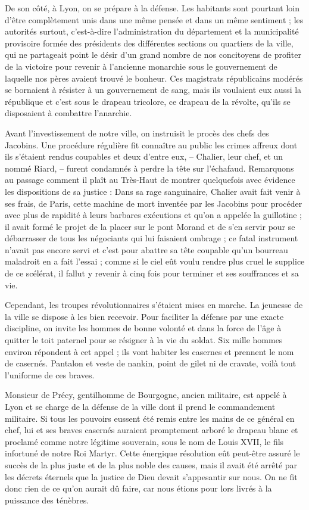 \documentclass[11pt,a4paper]{report}
\begin{document}
De son côté, à Lyon, on se prépare à la défense. Les habitants sont pourtant loin d'être complètement unis dans une même pensée et dans un même sentiment ; les autorités surtout, c'est-à-dire l'administration du département et la municipalité provisoire formée des présidents des différentes sections ou quartiers de la ville, qui ne partageait point le désir d'un grand nombre de nos concitoyens de profiter de la victoire pour revenir à l'ancienne monarchie sous le gouvernement de laquelle nos pères avaient trouvé le bonheur. Ces magistrats républicains modérés se bornaient à résister à un gouvernement de sang, mais ils voulaient eux aussi la république et c'est sous le drapeau tricolore, ce drapeau de la révolte, qu'ils se disposaient à combattre l'anarchie.

Avant l'investissement de notre ville, on instruisit le procès des chefs des Jacobins. Une procédure régulière fit connaître au public les crimes affreux dont ils s'étaient rendus coupables et deux d'entre eux, -- Chalier, leur chef, et un nommé Riard, -- furent condamnés à perdre la tête sur l'échafaud. Remarquons au passage comment il plaît au Très-Haut de montrer quelquefois avec évidence les dispositions de sa justice : Dans sa rage sanguinaire, Chalier avait fait venir à ses frais, de Paris, cette machine de mort inventée par les Jacobins pour procéder avec plus de rapidité à leurs barbares exécutions et qu'on a appelée la guillotine ; il avait formé le projet de la placer sur le pont Morand et de s'en servir pour se débarrasser de tous les négociants qui lui faisaient ombrage ; ce fatal instrument n'avait pas encore servi et c'est pour abattre sa tête coupable qu'un bourreau maladroit en a fait l'essai ; comme si le ciel eût voulu rendre plus cruel le supplice de ce scélérat, il fallut y revenir à cinq fois pour terminer et ses souffrances et sa vie.

Cependant, les troupes révolutionnaires s'étaient mises en marche. La jeunesse de la ville se dispose à les bien recevoir. Pour faciliter la défense par une exacte discipline, on invite les hommes de bonne volonté et dans la force de l'âge à quitter le toit paternel pour se résigner à la vie du soldat. Six mille hommes environ répondent à cet appel ; ils vont habiter les casernes et prennent le nom de casernés. Pantalon et veste de nankin, point de gilet ni de cravate, voilà tout l'uniforme de ces braves.

Monsieur de Précy, gentilhomme de Bourgogne, ancien militaire, est appelé à Lyon et se charge de la défense de la ville dont il prend le commandement militaire. Si tous les pouvoirs eussent été remis entre les mains de ce général en chef, lui et ses braves casernés auraient promptement arboré le drapeau blanc et proclamé comme notre légitime souverain, sous le nom de Louis XVII, le fils infortuné de notre Roi Martyr. Cette énergique résolution eût peut-être assuré le succès de la plus juste et de la plus noble des causes, mais il avait été arrêté par les décrets éternels que la justice de Dieu devait s'appesantir sur nous. On ne fit donc rien de ce qu'on aurait dû faire, car nous étions pour lors livrés à la puissance des ténèbres.
\end{document}
